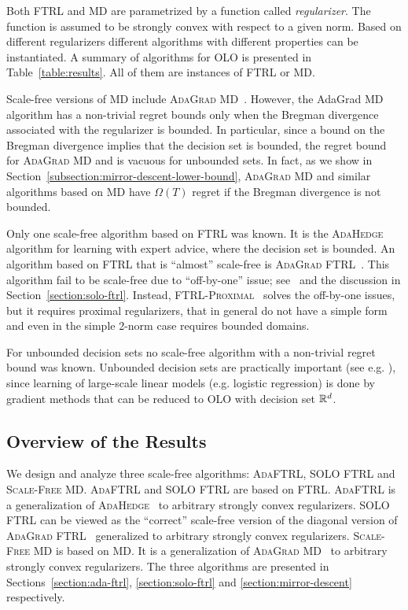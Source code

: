 Both \textsc{FTRL} and \textsc{MD} are parametrized by a function called 
\emph{regularizer}. The function is assumed to be strongly convex with respect
to a given norm. Based on different regularizers different algorithms with
different properties can be instantiated. A summary of algorithms for OLO is
presented in Table~\ref{table:results}.  All of them are instances of
\textsc{FTRL} or \textsc{MD}.

Scale-free versions of \textsc{MD} include \textsc{AdaGrad
MD}~\cite{Duchi-Hazan-Singer-2011}. However, the AdaGrad
MD algorithm has a non-trivial regret bounds only when the Bregman divergence associated with the regularizer
is bounded. In particular, since a bound on the Bregman divergence implies that
the decision set is bounded, the regret bound for \textsc{AdaGrad MD} and
is vacuous for unbounded sets. In fact, as we show in
Section~\ref{subsection:mirror-descent-lower-bound}, \textsc{AdaGrad MD} and
similar algorithms based on \textsc{MD} have $\Omega(T)$ regret if the Bregman
divergence is not bounded.

Only one scale-free algorithm based on \textsc{FTRL} was known. It is the
\textsc{AdaHedge}~\cite{de-Rooij-van-Erven-Grunwald-Koolen-2014} algorithm for
learning with expert advice, where the decision set is bounded.
An algorithm based on \textsc{FTRL} that is ``almost'' scale-free is 
\textsc{AdaGrad FTRL}~\cite{Duchi-Hazan-Singer-2011}.  This algorithm fail to
be scale-free due to ``off-by-one'' issue; see~\cite{McMahan-2014} and the
discussion in Section~\ref{section:solo-ftrl}. Instead, \textsc{FTRL-Proximal}~\cite{McMahan-Streeter-2010,McMahan-2014} solves the off-by-one issues, but it requires proximal regularizers, that in general do not have a simple form and even in the simple 2-norm case requires bounded domains.

For unbounded decision sets no scale-free algorithm with a non-trivial regret
bound was known. Unbounded decision sets are practically important (see e.g.
\cite{Mcmahan-Holt-Sculley-2013}), since learning of large-scale linear models
(e.g. logistic regression) is done by gradient methods that can be reduced to
OLO with decision set $\mathbb{R}^d$.

\subsection{Overview of the Results}

We design and analyze three scale-free algorithms: \textsc{AdaFTRL},
\textsc{SOLO FTRL} and \textsc{Scale-Free MD}.  \textsc{AdaFTRL} and
\textsc{SOLO FTRL} are based on \textsc{FTRL}.  \textsc{AdaFTRL} is a
generalization of
\textsc{AdaHedge}~\cite{de-Rooij-van-Erven-Grunwald-Koolen-2014} to arbitrary
strongly convex regularizers.  \textsc{SOLO FTRL} can be viewed as the
``correct'' scale-free version of the diagonal version of \textsc{AdaGrad
FTRL}~\cite{Duchi-Hazan-Singer-2011} generalized to arbitrary strongly convex
regularizers.  \textsc{Scale-Free MD} is based on \textsc{MD}. It is a
generalization of \textsc{AdaGrad MD}~\cite{Duchi-Hazan-Singer-2011} to
arbitrary strongly convex regularizers.  The three algorithms are presented in
Sections~\ref{section:ada-ftrl}, \ref{section:solo-ftrl} and
\ref{section:mirror-descent} respectively.

